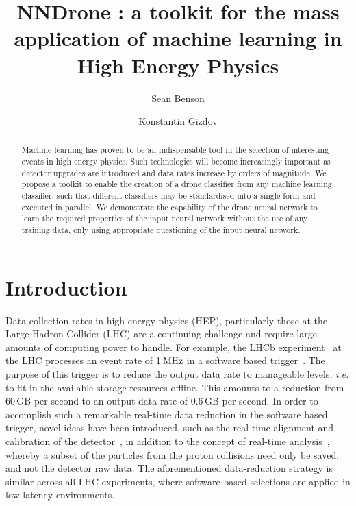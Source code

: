 \documentclass[final,5p,times,twocolumn]{elsarticle}
\def\lhcb {\mbox{LHCb}\xspace}
\def\mhz  {\ensuremath{{\rm \,MHz}}\xspace}
\newcommand{\ie}{\mbox{\itshape i.e.}\xspace}
\begin{document}

\begin{frontmatter}
\author[nl]{Sean Benson}
\author[uoe]{Konstantin Gizdov}
\address[nl]{Nikhef National Institute for Subatomic Physics, Amsterdam, The Netherlands}
\address[uoe]{School of Physics and Astronomy, University of Edinburgh, Edinburgh, United Kingdom}
\title{NNDrone : a toolkit for the mass application of machine learning in High Energy Physics}
\begin{abstract}
  \noindent
  Machine learning has proven to be an indispensable tool in the selection of
  interesting events in high energy physics. Such technologies will become increasingly
  important as detector upgrades are introduced and data rates increase by orders of magnitude.
  We propose a toolkit to enable the creation of a drone classifier from any machine learning
  classifier, such that different classifiers may be standardised into a single form and executed
  in parallel. We demonstrate the capability of the drone neural network
  to learn the required properties of the input neural network without
  the use of any training data, only using appropriate questioning of the input neural network.
\end{abstract}
\end{frontmatter}

\section{Introduction}
\label{sec:intro}

Data collection rates in high energy physics (HEP), particularly those at the Large Hadron Collider (LHC)
are a continuing challenge and require large amounts of computing power to handle.
For example, the \lhcb experiment~\cite{Alves:2008zz} at the LHC processes an event rate of 1\mhz in a software
based trigger~\cite{LHCb-DP-2014-002}. The purpose of this trigger is to reduce the output
data rate to manageable levels, \ie to fit in the available storage resources offline.
This amounts to a reduction from 60\,GB per second to an output data rate of 0.6\,GB per second.
In order to accomplish such a remarkable real-time data reduction in the software based trigger,
novel ideas have been introduced, such as the real-time alignment and calibration of the detector~\cite{Xu:2016mik},
in addition to the concept of real-time analysis~\cite{Aaij:2016rxn}, whereby a subset of the particles from the proton collisions need only
be saved, and not the detector raw data.
The aforementioned data-reduction strategy is similar across all LHC experiments, where
software based selections are applied in low-latency environments.
\end{document}
